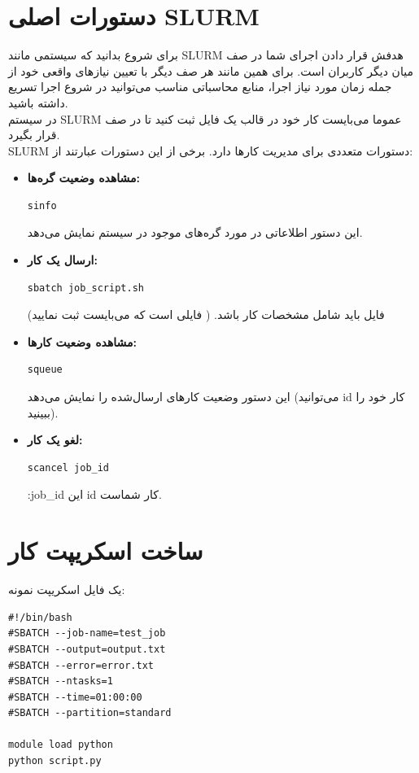 \documentclass[a4paper,12pt]{article}
\begin{document}
\section{دستورات اصلی SLURM}
برای شروع بدانید که سیستمی مانند SLURM هدفش قرار دادن اجرای شما در صف میان دیگر کاربران است. برای همین مانند هر صف دیگر با تعیین نیازهای واقعی خود از جمله زمان مورد نیاز اجرا، منابع محاسباتی مناسب می‌توانید در شروع اجرا تسریع داشته باشید.\\
در سیستم SLURM عموما می‌بایست کار
 خود در قالب یک فایل ثبت کنید تا در صف قرار بگیرد.\\
 
SLURM دستورات متعددی برای مدیریت کارها دارد. برخی از این دستورات عبارتند از:
\begin{itemize}
    \item \textbf{مشاهده وضعیت گره‌ها:}
    \begin{latin}
        \begin{verbatim}
sinfo
        \end{verbatim}
    \end{latin}
    این دستور اطلاعاتی در مورد گره‌های موجود در سیستم نمایش می‌دهد.
    
    \item \textbf{ارسال یک کار:}
    \begin{latin}
        \begin{verbatim}
sbatch job_script.sh
        \end{verbatim}
    \end{latin}
    فایل  باید شامل مشخصات کار باشد. (   فایلی است که می‌بایست ثبت نمایید)

    \item \textbf{مشاهده وضعیت کارها:}
    \begin{latin}
        \begin{verbatim}
squeue
        \end{verbatim}
    \end{latin}
    این دستور وضعیت کارهای ارسال‌شده را نمایش می‌دهد (می‌توانید id کار خود را ببینید).
    \item \textbf{لغو یک کار:}
    \begin{latin}
        \begin{verbatim}
scancel job_id
        \end{verbatim}
    \end{latin}
    :job\_id
    این id کار شماست.
\end{itemize}

\section{ساخت اسکریپت کار}
یک فایل اسکریپت نمونه:
\begin{latin}
\begin{verbatim}
#!/bin/bash
#SBATCH --job-name=test_job
#SBATCH --output=output.txt
#SBATCH --error=error.txt
#SBATCH --ntasks=1
#SBATCH --time=01:00:00
#SBATCH --partition=standard

module load python
python script.py
\end{verbatim}
\end{latin}
\end{document}
